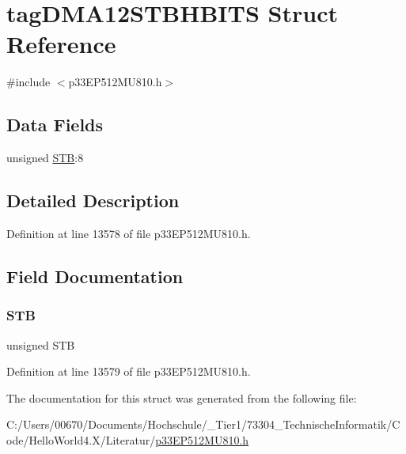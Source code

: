 \hypertarget{structtag_d_m_a12_s_t_b_h_b_i_t_s}{}\section{tag\+D\+M\+A12\+S\+T\+B\+H\+B\+I\+TS Struct Reference}
\label{structtag_d_m_a12_s_t_b_h_b_i_t_s}


{\ttfamily \#include $<$p33\+E\+P512\+M\+U810.\+h$>$}

\subsection*{Data Fields}
\begin{DoxyCompactItemize}
\item 
unsigned \hyperlink{structtag_d_m_a12_s_t_b_h_b_i_t_s_a9bd043a4db27e09b5035a563a8758fe7}{S\+TB}\+:8
\end{DoxyCompactItemize}


\subsection{Detailed Description}


Definition at line 13578 of file p33\+E\+P512\+M\+U810.\+h.



\subsection{Field Documentation}
\mbox{\label{structtag_d_m_a12_s_t_b_h_b_i_t_s_a9bd043a4db27e09b5035a563a8758fe7}} 
\subsubsection{\texorpdfstring{S\+TB}{STB}}
{\footnotesize\ttfamily unsigned S\+TB}



Definition at line 13579 of file p33\+E\+P512\+M\+U810.\+h.



The documentation for this struct was generated from the following file\+:\begin{DoxyCompactItemize}
\item 
C\+:/\+Users/00670/\+Documents/\+Hochschule/\+\_\+\+Tier1/73304\+\_\+\+Technische\+Informatik/\+Code/\+Hello\+World4.\+X/\+Literatur/\hyperlink{p33_e_p512_m_u810_8h}{p33\+E\+P512\+M\+U810.\+h}\end{DoxyCompactItemize}
